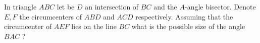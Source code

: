 In triangle $ABC$ let be $D$ an intersection of $BC$ and the $A$-angle bisector. Denote $E,F$ the circumcenters of $ABD$ and $ACD$ respectively. Assuming that the circumcenter of $AEF$ lies on the line $BC$ what is the possible size of the angle $BAC$ ?
